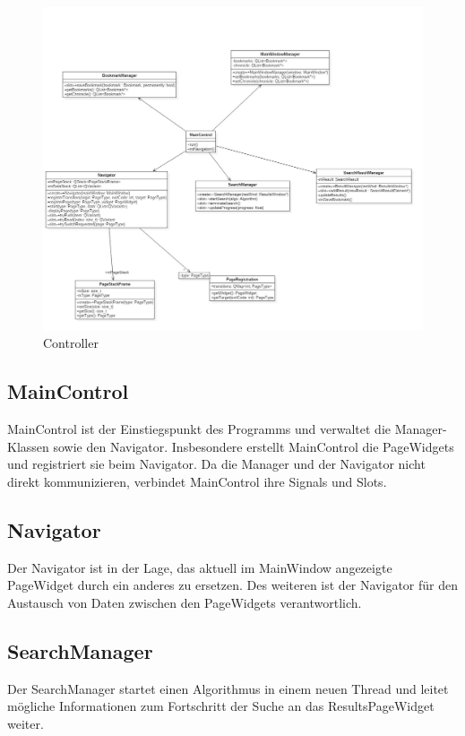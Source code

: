\begin{figure}[H]
\includegraphics[width=1\linewidth]{img/Klassendiagramm/Controller}
\caption{Controller}
\label{fig:controller}
\end{figure}


\subsection*{MainControl}
MainControl ist der Einstiegspunkt des Programms und verwaltet die Manager-Klassen sowie den Navigator. Insbesondere erstellt MainControl die PageWidgets und registriert sie beim Navigator.
Da die Manager und der Navigator nicht direkt kommunizieren, verbindet MainControl ihre Signals und Slots.

\subsection*{Navigator}
Der Navigator ist in der Lage, das aktuell im MainWindow angezeigte PageWidget durch ein anderes zu ersetzen. Des weiteren ist der Navigator für den Austausch von Daten zwischen den PageWidgets verantwortlich.

\subsection*{SearchManager}
Der SearchManager startet einen Algorithmus in einem neuen Thread und leitet mögliche Informationen zum Fortschritt der Suche an das ResultsPageWidget weiter.

